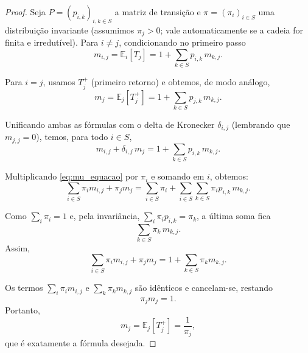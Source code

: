 \documentclass[12pt,letterpaper]{article}
\begin{document}
\begin{proof}
  Seja $P = (p_{i,k})_{i,k \in S}$ a matriz de transição e
  $\pi = (\pi_i)_{i \in S}$ uma distribuição invariante (assumimos
  $\pi_j > 0$; vale automaticamente se a cadeia for finita e
  irredutível). Para $i \ne j$, condicionando no primeiro passo
  \[
    m_{i,j} = \mathbb{E}_i[T_j]
    = 1 + \sum_{k \in S} p_{i,k} \, m_{k,j}.
  \]

  Para $i = j$, usamos $T_j^+$ (primeiro retorno) e obtemos, de modo
  análogo,
  \[
    m_j = \mathbb{E}_j[T_j^+] = 1 + \sum_{k \in S} p_{j,k} \,
    m_{k,j}.
  \]

Unificando ambas as fórmulas com o delta de Kronecker $\delta_{i,j}$
(lembrando que $m_{j,j} = 0$), temos, para todo $i \in S$,
\begin{equation}\label{eq:mu_equacao}
m_{i,j} + \delta_{i,j} \, m_j
= 1 + \sum_{k \in S} p_{i,k} \, m_{k,j}.
\tag{$*$}
\end{equation}

Multiplicando \eqref{eq:mu_equacao} por $\pi_i$ e somando em $i$,
obtemos:
\[
\sum_{i \in S} \pi_i m_{i,j} + \pi_j m_j
= \sum_{i \in S} \pi_i
+ \sum_{i \in S} \sum_{k \in S} \pi_i p_{i,k} \, m_{k,j}.
\]

Como $\sum_i \pi_i = 1$ e, pela invariância, 
$\sum_i \pi_i p_{i,k} = \pi_k$, a última soma fica
\[
\sum_{k \in S} \pi_k \, m_{k,j}.
\]
Assim,
\[
\sum_{i \in S} \pi_i m_{i,j} + \pi_j m_j
= 1 + \sum_{k \in S} \pi_k m_{k,j}.
\]

Os termos $\sum_i \pi_i m_{i,j}$ e $\sum_k \pi_k m_{k,j}$ são idênticos e cancelam-se, restando
\[
\pi_j m_j = 1.
\]
Portanto,
\[
m_j = \mathbb{E}_j[T_j^+] = \frac{1}{\pi_j},
\]
que é exatamente a fórmula desejada.
\end{proof}
\end{document}
